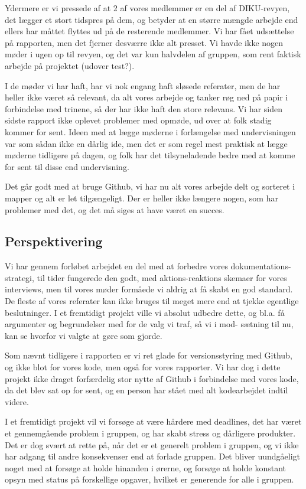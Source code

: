 \documentclass[10pt,a4paper,danish]{article}
\begin{document}
Ydermere er vi pressede af at 2 af vores medlemmer er en del af DIKU-revyen,
det lægger et stort tidspres på dem, og betyder at en større mængde arbejde
end ellers har måttet flyttes ud på de resterende medlemmer. Vi har fået
udsættelse på rapporten, men det fjerner desværre ikke alt presset. Vi havde
ikke nogen møder i ugen op til revyen, og det var kun halvdelen af gruppen,
som rent faktisk arbejde på projektet (udover test?).

I de møder vi har haft, har vi nok engang haft sløsede referater, men de har
heller ikke været så relevant, da alt vores arbejde og tanker røg ned på papir
i forbindelse med trinene, så der har ikke haft den store relevans. Vi har
siden sidste rapport ikke oplevet problemer med opmøde, ud over at folk stadig
kommer for sent. Ideen med at lægge møderne i forlængelse med undervisningen
var som sådan ikke en dårlig ide, men det er som regel mest praktisk at lægge
møderne tidligere på dagen, og folk har det tilsyneladende bedre med at komme
for sent til disse end undervisning. 

Det går godt med at bruge Github, vi har nu alt vores arbejde delt og sorteret
i mapper og alt er let tilgængeligt. Der er heller ikke længere nogen, som
har problemer med det, og det må siges at have været en succes.

\subsection{Perspektivering}

Vi har gennem forløbet arbejdet en del med at forbedre vores dokumentations-
strategi, til tider fungerede den godt, med aktions-reaktions skemaer for vores
interviews, men til vores møder formåede vi aldrig at få skabt en god standard.
De fleste af vores referater kan ikke bruges til meget mere end at tjekke
egentlige beslutninger. I et fremtidigt projekt ville vi absolut udbedre dette,
og bl.a. få argumenter og begrundelser med for de valg vi traf, så vi i mod-
sætning til nu, kan se hvorfor vi valgte at gøre som gjorde.

Som nævnt tidligere i rapporten er vi ret glade for versionsstyring med Github,
og ikke blot for vores kode, men også for vores rapporter. Vi har dog i dette
projekt ikke draget forfærdelig stor nytte af Github i forbindelse med vores
kode, da det blev sat op for sent, og en person har stået med alt kodearbejdet
indtil videre.

I et fremtidigt projekt vil vi forsøge at være hårdere med deadlines, det har
været et gennemgående problem i gruppen, og har skabt stress og dårligere
produkter. Det er dog svært at rette på, når det er et generelt problem i
gruppen, og vi ikke har adgang til andre konsekvenser end at forlade gruppen.
Det bliver uundgåeligt noget med at forsøge at holde hinanden i ørerne, og
forsøge at holde konstant opsyn med status på forskellige opgaver, hvilket er
generende for alle i gruppen.
\end{document}
